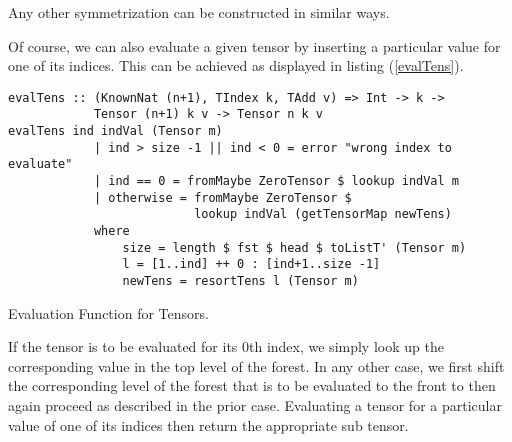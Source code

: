 Any other symmetrization can be constructed in similar ways.

Of course, we can also evaluate a given tensor by inserting a particular value for one of its indices. This can be achieved as displayed in listing (\ref{evalTens}).
\begin{listing}[hbt!] 
\begin{verbatim}
evalTens :: (KnownNat (n+1), TIndex k, TAdd v) => Int -> k ->
            Tensor (n+1) k v -> Tensor n k v
evalTens ind indVal (Tensor m)
            | ind > size -1 || ind < 0 = error "wrong index to evaluate"
            | ind == 0 = fromMaybe ZeroTensor $ lookup indVal m
            | otherwise = fromMaybe ZeroTensor $
                          lookup indVal (getTensorMap newTens)
            where
                size = length $ fst $ head $ toListT' (Tensor m)
                l = [1..ind] ++ 0 : [ind+1..size -1]
                newTens = resortTens l (Tensor m)
\end{verbatim}
\caption{Evaluation Function for Tensors.}\label{evalTens}
\end{listing}
If the tensor is to be evaluated for its $0$th index, we simply look up the corresponding value in the top level of the forest. In any other case, we first shift the corresponding level of the forest that is to be evaluated to the front to then again proceed as described in the prior case. Evaluating a tensor for a particular value of one of its indices then return the appropriate sub tensor. 

